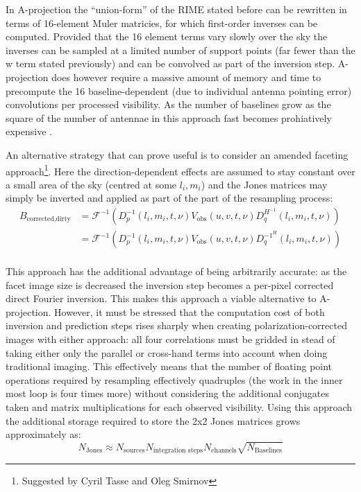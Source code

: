 In A-projection the ``union-form'' of the RIME stated before can be rewritten in terms of 16-element Muler matricies, for which first-order 
inverses can be computed. Provided that the 16 element terms vary slowly over the sky the inverses can be sampled at a limited number
of support points (far fewer than the w term stated previously) and can be convolved as part of the inversion step. A-projection does 
however require a massive amount of memory and time to precompute the 16 baseline-dependent (due to individual antenna pointing error) 
convolutions per processed visibility. As the number of baselines grow as the square of the number of antennae in this approach fast 
becomes prohiatively expensive \cite{tasse2013applying}.

An alternative strategy that can prove useful is to consider an amended faceting approach\footnote{Suggested by Cyril Tasse and Oleg Smirnov}. Here the 
direction-dependent effects are assumed to stay constant over a small area of the sky (centred at some $l_i,m_i$) and the Jones 
matrices may simply be inverted and applied as part of the part of the resampling process:
\begin{equation*}
 \begin{split}
 B_{\text{corrected,dirty}} &= \mathcal{F}^{-1}(D_p^{-1}(l_i,m_i,t,\nu)V_{\text{obs}}(u,v,t,\nu)D_q^{H^{-1}}(l_i,m_i,t,\nu))\\
			    &= \mathcal{F}^{-1}(D_p^{-1}(l_i,m_i,t,\nu)V_{\text{obs}}(u,v,t,\nu)D_q^{{-1}^H}(l_i,m_i,t,\nu))\\
 \end{split}
\end{equation*}

This approach has the additional advantage of being arbitrarily accurate: as the facet image size is decreased the inversion step
becomes a per-pixel corrected direct Fourier inversion. This makes this approach a viable alternative to A-projection. However, 
it must be stressed that the computation cost of both inversion and prediction steps rises sharply when creating polarization-corrected 
images with either approach: all four correlations must be gridded in stead of taking either only the parallel or cross-hand terms into 
account when doing traditional imaging. This effectively means that the number of floating point operations required by resampling 
effectively quadruples (the work in the inner most loop is four times more) without considering the additional conjugates taken and 
matrix multiplications for each observed visibility. Using this approach the additional storage required to store the 2x2 Jones 
matrices grows approximately as:
\begin{equation*}
 N_{\text{Jones}} \approx N_{\text{sources}}N_{\text{integration steps}}N_{\text{channels}}\sqrt{N_{\text{Baselines}}}
\end{equation*}

